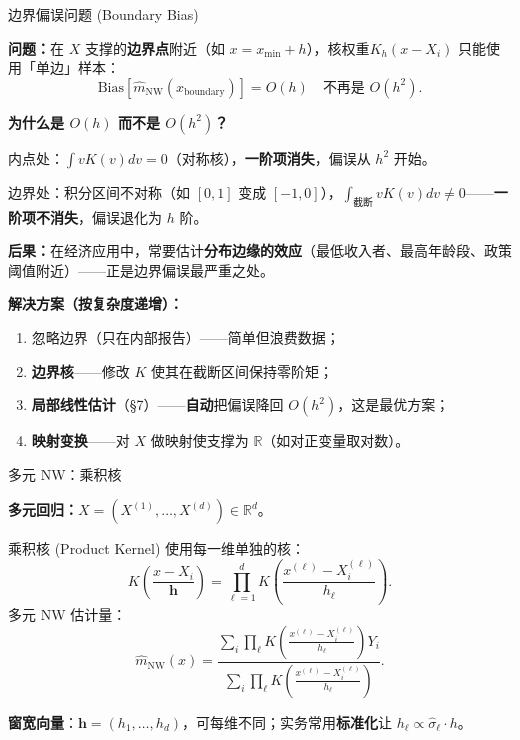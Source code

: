 \documentclass[aspectratio=169, 10pt]{beamer}
\begin{document}
\begin{frame}{边界偏误问题 (Boundary Bias)}

  \textbf{问题：}在 $X$ 支撑的\textbf{边界点}附近（如 $x = x_{\min} + h$），核权重$K_h(x-X_i)$ 只能使用「单边」样本：
  \[
    \text{Bias}[\hat m_{\text{NW}}(x_{\text{boundary}})] = O(h)\quad \text{不再是 }O(h^2).
  \]

  \begin{highlightbox}
    \textbf{为什么是 $O(h)$ 而不是 $O(h^2)$？}

    \vspace{0.2em}
    内点处：$\int vK(v)dv = 0$（对称核），\textbf{一阶项消失}，偏误从 $h^2$ 开始。

    边界处：积分区间不对称（如 $[0, 1]$ 变成 $[-1, 0]$），$\int_{\text{截断}} vK(v)dv \neq 0$——\textbf{一阶项不消失}，偏误退化为 $h$ 阶。
  \end{highlightbox}

  \vspace{0.3em}

  \textbf{后果：}在经济应用中，常要估计\textbf{分布边缘的效应}（最低收入者、最高年龄段、政策阈值附近）——正是边界偏误最严重之处。

  \begin{keybox}
    \textbf{解决方案（按复杂度递增）：}
    \begin{enumerate}
      \item 忽略边界（只在内部报告）——简单但浪费数据；
      \item \textbf{边界核}——修改 $K$ 使其在截断区间保持零阶矩；
      \item \textbf{局部线性估计}（\S7）——\textbf{自动}把偏误降回 $O(h^2)$，这是最优方案；
      \item \textbf{映射变换}——对 $X$ 做映射使支撑为 $\mathbb{R}$（如对正变量取对数）。
    \end{enumerate}
  \end{keybox}

\end{frame}


\begin{frame}{多元 NW：乘积核}

  \textbf{多元回归：}$X = (X^{(1)},\ldots,X^{(d)})\in\mathbb{R}^d$。

  \begin{definitionbox}{乘积核 (Product Kernel)}
    使用每一维单独的核：
    \[
      K\!\left(\frac{x-X_i}{\mathbf{h}}\right) = \prod_{\ell=1}^d K\!\left(\frac{x^{(\ell)} - X_i^{(\ell)}}{h_\ell}\right).
    \]
    多元 NW 估计量：
    \[
      \hat m_{\text{NW}}(x) = \frac{\sum_i \prod_\ell K\!\left(\frac{x^{(\ell)}-X_i^{(\ell)}}{h_\ell}\right) Y_i}{\sum_i \prod_\ell K\!\left(\frac{x^{(\ell)}-X_i^{(\ell)}}{h_\ell}\right)}.
    \]
  \end{definitionbox}

  \textbf{窗宽向量}：$\mathbf{h} = (h_1, \ldots, h_d)$，可每维不同；实务常用\textbf{标准化}让 $h_\ell \propto \hat\sigma_\ell \cdot h$。

\end{frame}
\end{document}
